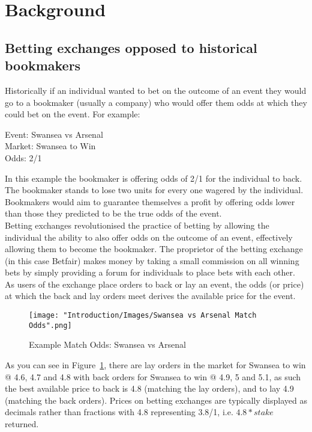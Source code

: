 	\section{Background}
		\subsection{Betting exchanges opposed to historical bookmakers}
			Historically if an individual wanted to bet on the outcome of an event they would go to a bookmaker (usually a company) who would offer them odds at which they could bet on the event. For example:
			
			\begin{center}
			\begin{minipage}{6cm}
				Event: Swansea vs Arsenal\\
				Market: Swansea to Win\\
				Odds: 2/1			
			\end{minipage}
			\end{center}
			
			In this example the bookmaker is offering odds of 2/1 for the individual to back. The bookmaker stands to lose two units for every one wagered by the individual. Bookmakers would aim to guarantee themselves a profit by offering odds lower than those they predicted to be the true odds of the event.\\
			
			Betting exchanges revolutionised the practice of betting by allowing the individual the ability to also offer odds on the outcome of an event, effectively allowing them to become the bookmaker. The proprietor of the betting exchange (in this case Betfair) makes money by taking a small commission on all winning bets by simply providing a forum for individuals to place bets with each other.\\
			
			As users of the exchange place orders to back or lay an event, the odds (or price) at which the back and lay orders meet derives the available price for the event.\\
			
			\begin{figure}[h]
			\texttt{[image: "Introduction/Images/Swansea vs Arsenal Match Odds".png]}
			\centering
			\caption{Example Match Odds: Swansea vs Arsenal}
    			\label{fig:swanseaArsenalMatchOdds}
			\centering
			\end{figure}
			
			As you can see in Figure~\ref{fig:swanseaArsenalMatchOdds}, there are lay orders in the market for Swansea to win @ 4.6, 4.7 and 4.8 with back orders for Swansea to win @ 4.9, 5 and  5.1, as such the best available price to back is 4.8 (matching the lay orders), and to lay 4.9 (matching the back orders). Prices on betting exchanges are typically displayed as decimals rather than fractions with 4.8 representing 3.8/1, i.e. $4.8 * stake$ returned.
			
